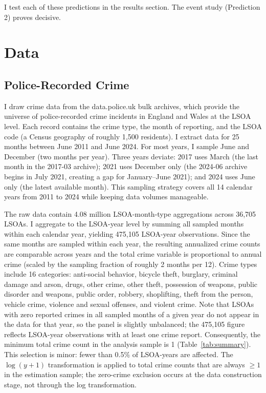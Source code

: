 \documentclass[12pt]{article}
\begin{document}
I test each of these predictions in the results section. The event study (Prediction 2) proves decisive.


\section{Data}

\subsection{Police-Recorded Crime}

I draw crime data from the data.police.uk bulk archives, which provide the universe of police-recorded crime incidents in England and Wales at the LSOA level. Each record contains the crime type, the month of reporting, and the LSOA code (a Census geography of roughly 1,500 residents). I extract data for 25 months between June 2011 and June 2024. For most years, I sample June and December (two months per year). Three years deviate: 2017 uses March (the last month in the 2017-03 archive); 2021 uses December only (the 2024-06 archive begins in July 2021, creating a gap for January--June 2021); and 2024 uses June only (the latest available month). This sampling strategy covers all 14 calendar years from 2011 to 2024 while keeping data volumes manageable.

The raw data contain 4.08 million LSOA-month-type aggregations across 36,705 LSOAs. I aggregate to the LSOA-year level by summing all sampled months within each calendar year, yielding 475,105 LSOA-year observations. Since the same months are sampled within each year, the resulting annualized crime counts are comparable across years and the total crime variable is proportional to annual crime (scaled by the sampling fraction of roughly 2 months per 12). Crime types include 16 categories: anti-social behavior, bicycle theft, burglary, criminal damage and arson, drugs, other crime, other theft, possession of weapons, public disorder and weapons, public order, robbery, shoplifting, theft from the person, vehicle crime, violence and sexual offenses, and violent crime. Note that LSOAs with zero reported crimes in all sampled months of a given year do not appear in the data for that year, so the panel is slightly unbalanced; the 475,105 figure reflects LSOA-year observations with at least one crime report. Consequently, the minimum total crime count in the analysis sample is 1 (Table~\ref{tab:summary}). This selection is minor: fewer than 0.5\% of LSOA-years are affected. The $\log(y+1)$ transformation is applied to total crime counts that are always $\geq 1$ in the estimation sample; the zero-crime exclusion occurs at the data construction stage, not through the log transformation.
\end{document}
